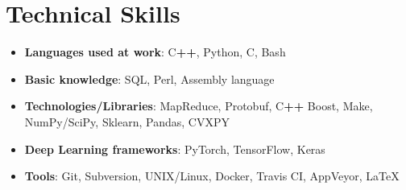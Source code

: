 \documentclass[letterpaper,11pt]{article}
\newcommand{\resumeItem}[2]{
    \item\small{
        \textbf{#1}{: #2 \vspace{-2pt}}
    }
}
\newcommand{\resumeSubItem}[2]{\resumeItem{#1}{#2}\vspace{-4pt}}
\newcommand{\resumeSubHeadingListStart}{\begin{itemize}[leftmargin=*]}
\newcommand{\resumeSubHeadingListEnd}{\end{itemize}}
\begin{document}
\vspace{-20pt}
\section{Technical Skills}
\resumeSubHeadingListStart
    \resumeSubItem{Languages used at work}{C\textbf{\footnotesize++}, Python, C, Bash}
    \resumeSubItem{Basic knowledge}{SQL, Perl, Assembly language}
    \resumeSubItem{Technologies/Libraries}{MapReduce, Protobuf, C\textbf{\footnotesize++} Boost, Make, NumPy/SciPy, Sklearn, Pandas, CVXPY}
    \resumeSubItem{Deep Learning frameworks}{PyTorch, TensorFlow, Keras}
    \resumeSubItem{Tools}{Git, Subversion, UNIX/Linux, Docker, Travis CI, AppVeyor, \LaTeX}
\resumeSubHeadingListEnd

\end{document}
